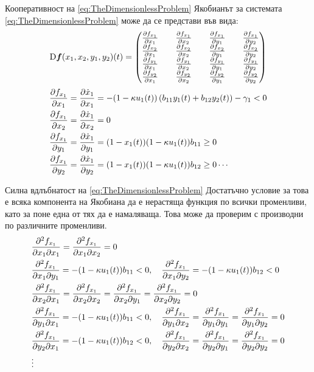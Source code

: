 \begin{frame}[t]{Кооперативност на \ref{eq:TheDimensionlessProblem}}
  Якобианът за системата \ref{eq:TheDimensionlessProblem} може да се представи във вида:
  \begin{equation*}
    \mathrm{D} \boldsymbol{f}(x_1, x_2, y_1, y_2)(t) =
    \begin{pmatrix}
      \pdv{f_{x_1}}{x_1} && \pdv{f_{x_1}}{x_2} && \pdv{f_{x_1}}{y_1} && \pdv{f_{x_1}}{y_2} \\
      \pdv{f_{x_2}}{x_1} && \pdv{f_{x_2}}{x_2} && \pdv{f_{x_2}}{y_1} && \pdv{f_{x_2}}{y_2} \\
      \pdv{f_{y_1}}{x_1} && \pdv{f_{y_1}}{x_2} && \pdv{f_{y_1}}{y_1} && \pdv{f_{y_1}}{y_2} \\
      \pdv{f_{y_2}}{x_1} && \pdv{f_{y_2}}{x_2} && \pdv{f_{y_2}}{y_1} && \pdv{f_{y_2}}{y_2}
    \end{pmatrix}
  \end{equation*}
  \label{eq:JacobianElements}
  \begin{equation*}
    \begin{split}
      &\pdv{f_{x_1}}{x_1} = \pdv{\dot{x}_1}{x_1} = -(1-\kappa u_1(t)) \left(b_{11} y_1(t) + b_{12} y_2(t)\right) - \gamma_1 < 0 \\
      &\pdv{f_{x_1}}{x_2} = \pdv{\dot{x}_1}{x_2} = 0 \\
      &\pdv{f_{x_1}}{y_1} = \pdv{\dot{x}_1}{y_1} = (1-x_1(t)) (1-\kappa u_1(t)) b_{11} \geq 0 \\
      &\pdv{f_{x_1}}{y_2} = \pdv{\dot{x}_1}{y_2} = (1-x_1(t)) (1-\kappa u_1(t)) b_{12} \geq 0 \cdots
      \end{split}
      \end{equation*}
      \end{frame}

      \begin{frame}[t]{Силна вдлъбнатост на \ref{eq:TheDimensionlessProblem}}
      Достатъчно условие за това е всяка компонента на Якобиана да е нерастяща функция по всички променливи, като за поне една от тях да е намаляваща. Това може да проверим с производни по различните променливи.
      \begin{equation*}
      \begin{split}
      &\pdv{f_{x_1}}{x_1}{x_1} = \pdv{f_{x_1}}{x_1}{x_2}= 0 \\
      &\pdv{f_{x_1}}{x_1}{y_1} = -(1-\kappa u_1(t)) b_{11} < 0, \quad
      \pdv{f_{x_1}}{x_1}{y_2} = -(1-\kappa u_1(t)) b_{12} < 0 \\
      &\pdv{f_{x_1}}{x_2}{x_1} = \pdv{f_{x_1}}{x_2}{x_2} = \pdv{f_{x_1}}{x_2}{y_1} = \pdv{f_{x_1}}{x_2}{y_2} = 0 \\
      &\pdv{f_{x_1}}{y_1}{x_1} = -(1-\kappa u_1(t)) b_{11} < 0, \quad
      \pdv{f_{x_1}}{y_1}{x_2} = \pdv{f_{x_1}}{y_1}{y_1} = \pdv{f_{x_1}}{y_1}{y_2} = 0 \\
      &\pdv{f_{x_1}}{y_2}{x_1} = -(1-\kappa u_1(t)) b_{12} < 0, \quad
      \pdv{f_{x_1}}{y_2}{x_2} = \pdv{f_{x_1}}{y_2}{y_1} = \pdv{f_{x_1}}{y_2}{y_2} = 0 \\
      &\vdots
    \end{split}
  \end{equation*}
  \end{frame}

